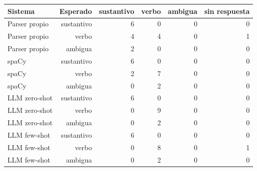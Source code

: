 \begin{tabular}{lrrrrr}
\toprule
Sistema & Esperado & sustantivo & verbo & ambigua & sin respuesta \\
\midrule
Parser propio & sustantivo & 6 & 0 & 0 & 0 \\
Parser propio & verbo & 4 & 4 & 0 & 1 \\
Parser propio & ambigua & 2 & 0 & 0 & 0 \\
spaCy & sustantivo & 6 & 0 & 0 & 0 \\
spaCy & verbo & 2 & 7 & 0 & 0 \\
spaCy & ambigua & 0 & 2 & 0 & 0 \\
LLM zero-shot & sustantivo & 6 & 0 & 0 & 0 \\
LLM zero-shot & verbo & 0 & 9 & 0 & 0 \\
LLM zero-shot & ambigua & 0 & 2 & 0 & 0 \\
LLM few-shot & sustantivo & 6 & 0 & 0 & 0 \\
LLM few-shot & verbo & 0 & 8 & 0 & 1 \\
LLM few-shot & ambigua & 0 & 2 & 0 & 0 \\
\bottomrule
\end{tabular}
